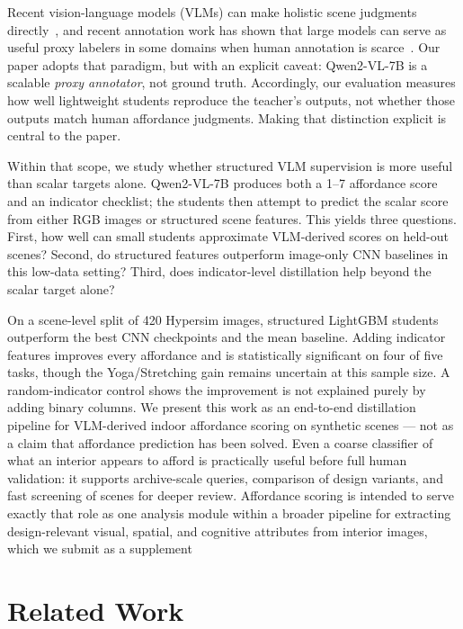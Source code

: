 \documentclass[10pt,twocolumn]{article}
\begin{document}
Recent vision-language models (VLMs) can make holistic scene judgments
directly~\cite{Bai2023,Radford2021}, and recent annotation work has shown that
large models can serve as useful proxy labelers in some domains when human
annotation is scarce~\cite{Gilardi2023}. Our paper adopts that paradigm, but
with an explicit caveat: Qwen2-VL-7B is a scalable \emph{proxy annotator}, not
ground truth. Accordingly, our evaluation measures how well lightweight
students reproduce the teacher's outputs, not whether those outputs match human
affordance judgments. Making that distinction explicit is central to the
paper.

Within that scope, we study whether structured VLM supervision is more useful
than scalar targets alone. Qwen2-VL-7B produces both a 1--7 affordance score
and an indicator checklist; the students then attempt to predict the scalar
score from either RGB images or structured scene features. This yields three
questions. First, how well can small students approximate VLM-derived scores on
held-out scenes? Second, do structured features outperform image-only CNN
baselines in this low-data setting? Third, does indicator-level distillation
help beyond the scalar target alone?

On a scene-level split of 420 Hypersim images, structured LightGBM students outperform the best CNN checkpoints and the mean baseline. Adding indicator features improves every affordance and is statistically significant on four of five tasks, though the Yoga/Stretching gain remains uncertain at this sample size. A random-indicator control shows the improvement is not explained purely by adding binary columns. We present this work as an end-to-end distillation pipeline for VLM-derived indoor affordance scoring on synthetic scenes — not as a claim that affordance prediction has been solved. Even a coarse classifier of what an interior appears to afford is practically useful before full human validation: it supports archive-scale queries, comparison of design variants, and fast screening of scenes for deeper review. Affordance scoring is intended to serve exactly that role as one analysis module within a broader pipeline for extracting design-relevant visual, spatial, and cognitive attributes from interior images, which we submit as a supplement 

\section{Related Work}
\label{sec:related}
\end{document}
